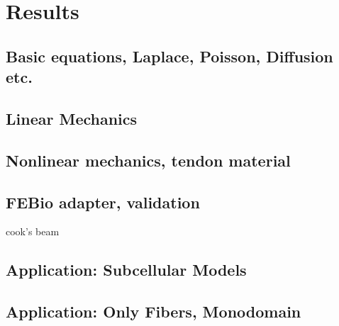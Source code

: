 \chapter{Results}\label{sec:results}

\section{Basic equations, Laplace, Poisson, Diffusion etc.}
\section{Linear Mechanics}
\section{Nonlinear mechanics, tendon material}
\section{FEBio adapter, validation}

cook's beam

\section{Application: Subcellular Models}
\section{Application: Only Fibers, Monodomain}

